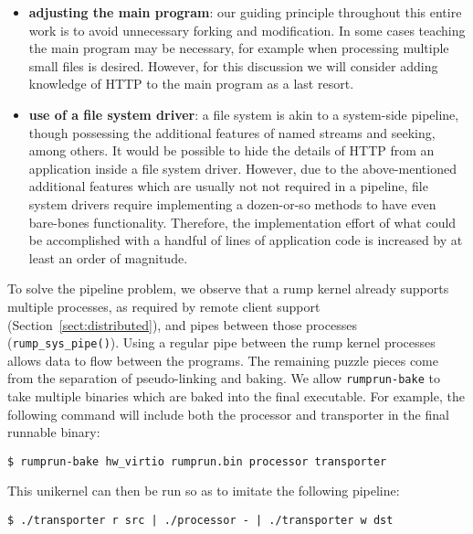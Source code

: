 \begin{itemize}
\item	\textbf{adjusting the main program}: our
	guiding principle throughout this entire work is to avoid
	unnecessary forking and modification.  In some cases teaching
	the main program may be necessary, for example when processing
	multiple small files is desired.  However, for this discussion
	we will consider adding knowledge of HTTP to the main program
	as a last resort.

\item	\textbf{use of a file system driver}: a file system is akin to
	a system-side pipeline, though possessing the additional features of
	named streams and seeking, among others.  It would be possible to
	hide the details of HTTP from an application inside a file
	system driver.	However, due to the above-mentioned additional
	features which are usually not not required in a pipeline, file
	system drivers require implementing a dozen-or-so methods to have
	even bare-bones functionality.  Therefore, the implementation
	effort of what could be accomplished with a handful of lines
	of application code is increased by at least an order of
	magnitude.
\end{itemize}

To solve the pipeline problem, we observe that a rump kernel already
supports multiple processes, as required by remote client support
(Section~\ref{sect:distributed}), and pipes between those processes
(\verb+rump_sys_pipe()+).
Using a regular pipe between the rump kernel processes allows data to
flow between the programs.  The remaining puzzle pieces come from the
separation of pseudo-linking and baking.  We allow \verb+rumprun-bake+
to take multiple binaries which are baked into the final executable.
For example, the following command will include both the processor and
transporter in the final runnable binary:

\begin{verbatim}
$ rumprun-bake hw_virtio rumprun.bin processor transporter
\end{verbatim}

This unikernel can then be run so as to imitate the following pipeline:

\begin{verbatim}
$ ./transporter r src | ./processor - | ./transporter w dst
\end{verbatim}

